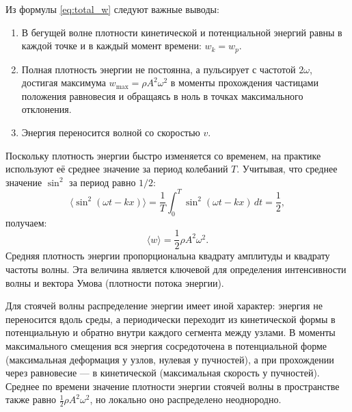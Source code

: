 \begin{property}
Из формулы \eqref{eq:total_w} следуют важные выводы:
\begin{enumerate}
    \item В бегущей волне плотности кинетической и потенциальной энергий равны в каждой точке и в каждый момент времени: $w_k = w_p$.
    \item Полная плотность энергии не постоянна, а пульсирует с частотой $2\omega$, достигая максимума $w_{\max} = \rho A^2 \omega^2$ в моменты прохождения частицами положения равновесия и обращаясь в ноль в точках максимального отклонения.
    \item Энергия переносится волной со скоростью $v$.
\end{enumerate}
\end{property}

\begin{definition}
Поскольку плотность энергии быстро изменяется со временем, на практике используют её среднее значение за период колебаний $T$. Учитывая, что среднее значение $\sin^2$ за период равно $1/2$:
\begin{equation}
    \langle \sin^2(\omega t - kx) \rangle = \frac{1}{T} \int_0^T \sin^2(\omega t - kx) \, dt = \frac{1}{2},
\end{equation}
получаем:
\begin{equation}
    \langle w \rangle = \frac{1}{2} \rho A^2 \omega^2. \label{eq:avg_w}
\end{equation}
Средняя плотность энергии пропорциональна квадрату амплитуды и квадрату частоты волны. Эта величина является ключевой для определения интенсивности волны и вектора Умова (плотности потока энергии).
\end{definition}

\begin{remark}
Для стоячей волны распределение энергии имеет иной характер: энергия не переносится вдоль среды, а периодически переходит из кинетической формы в потенциальную и обратно внутри каждого сегмента между узлами. В моменты максимального смещения вся энергия сосредоточена в потенциальной форме (максимальная деформация у узлов, нулевая у пучностей), а при прохождении через равновесие --- в кинетической (максимальная скорость у пучностей). Среднее по времени значение плотности энергии стоячей волны в пространстве также равно $\frac{1}{2} \rho A^2 \omega^2$, но локально оно распределено неоднородно.
\end{remark}
